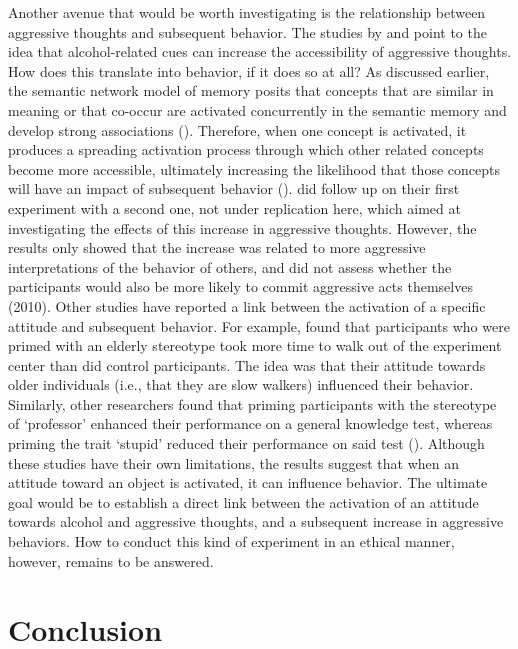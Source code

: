 \documentclass[serif, authorddate, twocolumn, empirical]{jote-article}
\begin{document}
Another avenue that would be worth investigating is the relationship between aggressive thoughts and subsequent behavior. The studies by \textcite{BartholowHeinz2006} and \textcite{SubraMullerBegueLBushmanDelmas2010} point to the idea that alcohol-related cues can increase the accessibility of aggressive thoughts. How does this translate into behavior, if it does so at all? As discussed earlier, the semantic network model of memory posits that concepts that are similar in meaning or that co-occur are activated concurrently in the semantic memory and develop strong associations (\cite{AndersonJrJBartholow1998}). Therefore, when one concept is activated, it produces a spreading activation process through which other related concepts become more accessible, ultimately increasing the likelihood that those concepts will have an impact of subsequent behavior (\cite{BartholowHeinz2006}). \textcite{BartholowHeinz2006} did follow up on their first experiment with a second one, not under replication here, which aimed at investigating the effects of this increase in aggressive thoughts. However, the results only showed that the increase was related to more aggressive interpretations of the behavior of others, and did not assess whether the participants would also be more likely to commit aggressive acts themselves (2010). Other studies have reported a link between the activation of a specific attitude and subsequent behavior. For example, \textcite{BarghChenBurrows1996} found that participants who were primed with an elderly stereotype took more time to walk out of the experiment center than did control participants. The idea was that their attitude towards older individuals (i.e., that they are slow walkers) influenced their behavior. Similarly, other researchers found that priming participants with the stereotype of ‘professor’ enhanced their performance on a general knowledge test, whereas priming the trait ‘stupid’ reduced their performance on said test (\cite{DijksterhuisVanKnippenberg1998}). Although these studies have their own limitations, the results suggest that when an attitude toward an object is activated, it can influence behavior. The ultimate goal would be to establish a direct link between the activation of an attitude towards alcohol and aggressive thoughts, and a subsequent increase in aggressive behaviors. How to conduct this kind of experiment in an ethical manner, however, remains to be answered.

{}
\section*{Conclusion} %
\label{sec:conclusion}
\end{document}
